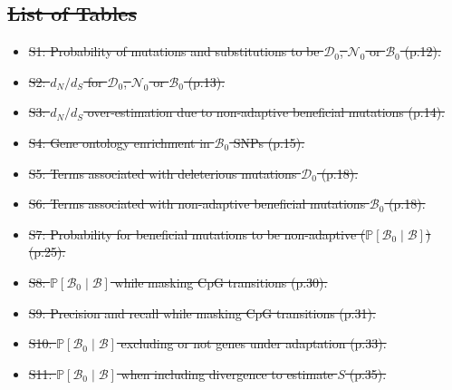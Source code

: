 \documentclass[10pt,letterpaper]{article}
\newcommand{\proba}{\mathbb{P}}
\newcommand{\dn}{d_N}
\newcommand{\ds}{d_S}
\newcommand{\dnds}{\dn / \ds}
\newcommand{\SphyDel}{\mathcal{D}_0}
\newcommand{\SphyNeu}{\mathcal{N}_0}
\newcommand{\SphyBen}{\mathcal{B}_0}
\newcommand{\given}{\mid}
\newcommand{\Spop}{S}
\newcommand{\SpopBen}{\mathcal{B}}
\providecommand{\DIFdeltex}[1]{{\protect\color{red}\sout{#1}}}                      %
\providecommand{\DIFdel}[1]{\texorpdfstring{\DIFdeltex{#1}}{}} %
\begin{document}
\subsection*{\DIFdel{List of Tables}}
\begin{itemize}%
\item%
\DIFdel{S1: Probability of mutations and substitutions to be $\SphyDel$, $\SphyNeu$ or $\SphyBen$ (p.12).
}%
\item%
\DIFdel{S2: $\dnds$ for $\SphyDel$, $\SphyNeu$ or $\SphyBen$ (p.13).
}%
\item%
\DIFdel{S3: $\dnds$ over-estimation due to non-adaptive beneficial mutations (p.14).
}%
\item%
\DIFdel{S4: Gene ontology enrichment in $\SphyBen$ SNPs (p.15).
}%
\item%
\DIFdel{S5: Terms associated with deleterious mutations $\SphyDel$ (p.18).
}%
\item%
\DIFdel{S6: Terms associated with non-adaptive beneficial mutations $\SphyBen$ (p.18).
}%
\item%
\DIFdel{S7: Probability for beneficial mutations to be non-adaptive ($\proba[\SphyBen\given \SpopBen ]$) (p.25).
}%
\item%
\DIFdel{S8: $\proba[\SphyBen\given \SpopBen ]$ while masking CpG transitions (p.30).
}%
\item%
\DIFdel{S9: Precision and recall while masking CpG transitions (p.31).
}%
\item%
\DIFdel{S10: $\proba[\SphyBen\given \SpopBen ]$ excluding or not genes under adaptation (p.33).
}%
\item%
\DIFdel{S11: $\proba[\SphyBen\given \SpopBen ]$ when including divergence to estimate $\Spop$ (p.35).
}
\end{itemize}
\end{document}
